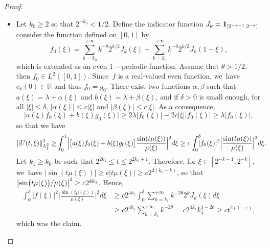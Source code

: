 \documentclass[JEP,XML,SOM,Unicode,NoFloatCountersInSection,published]{cedram}
\theoremstyle{definition}
\let\eps\varepsilon
\let\dis\relax
\newcommand\R{\mathbb R}
\newcommand{\bpac}[1]{\bigl[#1\bigr]}
\newcommand{\Babs}[1]{\Bigl|#1\Bigr|}
\begin{document}
\begin{proof}
\begin{itemize}
\item
Let $k_0\geq 2$ so that $2^{-k_0}<1 /2$. Define the indicator function $\dis J_k= {\mathbf 1}_{[{2^{-k-1}}, {2^{-k}}]}$ consider the function defined on $[0,1]$ by
\[
{f}_0(\xi)=\sum_{k=k_0}^{+\infty}{k^{-\theta}}{2^{k/2}}J_k(\xi)+ \sum_{k=k_0}^{+\infty}{k^{-\theta}}{2^{k/2}}J_k(1-\xi),
\]
which is extended as an even $1-$periodic function. Assume that $\theta>1/2$, then ${f}_0 \in L^2([0,1])$. Since~${f}$ is a real-valued even function, we~have $c_k(0) \in \R$ and thus ${f}_0={g}_0$. There exist two functions $\alpha, \beta$ such that $a(\xi)= \lambda +\alpha(\xi)$ and $b(\xi)=\lambda+\beta(\xi)$, and if $\delta>0$ is small enough, for all $|\xi| \leq \delta$, $|\alpha(\xi)| \leq c |\xi|$ and $|\beta(\xi)| \leq c |\xi|$. As a consequence,
\begin{equation*}
\big|a(\xi){f}_0(\xi)+b(\xi){g}_0(\xi)\big| \geq 2\lambda |{f}_0(\xi)| -2c |\xi| |{f}_0(\xi)| \geq \lambda |{f}_0(\xi)|,
\end{equation*}
so that we have
\begin{align*}
\|{U}(t,\xi)\|_{L^2_\xi}^2 &\geq\!\int_0^1 \Babs{\bpac{a(\xi){f}_0(\xi)+b(\xi){g}_0(\xi)}\frac{\sin(t\mu(\xi))}{\mu(\xi)}}^2d\xi \geq c \int_0^\delta\hspace*{-2mm} | {f}_0(\xi) |^2 \Big| \frac{\sin(t\mu(\xi))}{\mu(\xi)}\Big|^2d\xi.
\end{align*}
Let $k_1\geq k_0$ be such that $2^{2k_1} \leq t \leq 2^{2k_1+1}$. Therefore, for $\xi \in {[{2^{-k-1}}, {2^{-k}}]}$, we~have $|\sin(t\mu(\xi))| \geq c |t\mu(\xi)| \geq c 2^{2(k_1-k)}$, so that $\dis \big| {\sin\bigl(t\mu(\xi)\bigr)}/{\mu(\xi)}\big|^2 \geq c2^{4k_1}$. Hence,
\begin{align*}
\int_0^\delta | {f}(\xi) |^2 \Big| \frac{\sin(t\mu(\xi))}{\mu(\xi)}\Big|^2d\xi
&\geq c 2^{4k_1}\int_0^\delta \sum_{k=k_1}^{+\infty}k^{-2\theta} {2^{k}}J_k(\xi) d\xi \\
&\geq c 2^{4k_1} \sum_{k=k_1}^{+\infty}{k^{-2\theta}} =c 2^{4k_1}k_1^{1-2\theta} \geq c t^{2(1-\eps)},
\end{align*}
which was the claim.\qedhere
\end{itemize}
\end{proof}

\appendix
\end{document}
